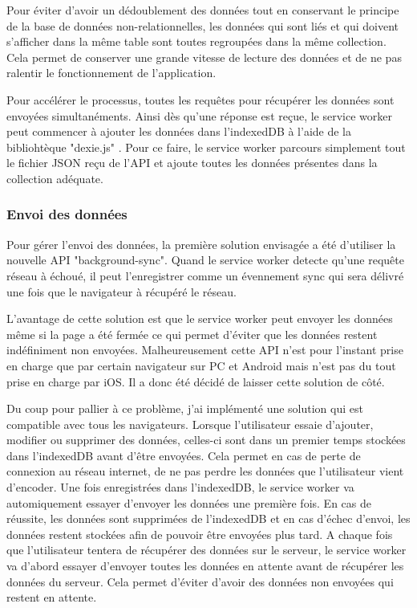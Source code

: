 \documentclass{EPL-master-thesis-covers-FR}
\begin{document}
					Pour éviter d'avoir un dédoublement des données tout en conservant le principe de la base de données non-relationnelles, les données qui sont liés et qui doivent s'afficher dans la même table sont toutes regroupées dans la même collection. Cela permet de conserver une grande vitesse de lecture des données et de ne pas ralentir le fonctionnement de l'application.
							
					Pour accélérer le processus, toutes les requêtes pour récupérer les données sont envoyées simultanéments. Ainsi dès qu'une réponse est reçue, le service worker peut commencer à ajouter les données dans l'indexedDB à l'aide de la bibliohtèque "dexie.js" \cite{ref:dexie}. Pour ce faire, le service worker parcours simplement tout le fichier JSON reçu de l'API et ajoute toutes les données présentes dans la collection adéquate.
				
				\subsubsection*{Envoi des données}
					Pour gérer l'envoi des données, la première solution envisagée a été d'utiliser la nouvelle API "background-sync". Quand le service worker detecte qu'une requête réseau à échoué, il peut l'enregistrer comme un évennement sync qui sera délivré une fois que le navigateur à récupéré le réseau. 
					
					L'avantage de cette solution est que le service worker peut envoyer les données même si la page a été fermée ce qui permet d'éviter que les données restent indéfiniment non envoyées. Malheureusement cette API n'est pour l'instant prise en charge que par certain navigateur sur PC et Android mais n'est pas du tout prise en charge par iOS. Il a donc été décidé de laisser cette solution de côté.
					
					Du coup pour pallier à ce problème, j'ai implémenté une solution qui est compatible avec tous les navigateurs. Lorsque l'utilisateur essaie d'ajouter, modifier ou supprimer des données, celles-ci sont dans un premier temps stockées dans l'indexedDB avant d'être envoyées. Cela permet en cas de perte de connexion au réseau internet, de ne pas perdre les données que l'utilisateur vient d'encoder. Une fois enregistrées dans l'indexedDB, le service worker va automiquement essayer d'envoyer les données une première fois. En cas de réussite, les données sont supprimées de l'indexedDB et en cas d'échec d'envoi, les données restent stockées afin de pouvoir être envoyées plus tard. A chaque fois que l'utilisateur tentera de récupérer des données  sur le serveur, le service worker va d'abord essayer d'envoyer toutes les données en attente avant de récupérer les données du serveur. Cela permet d'éviter d'avoir des données non envoyées qui restent  en attente.
					
\end{document}
